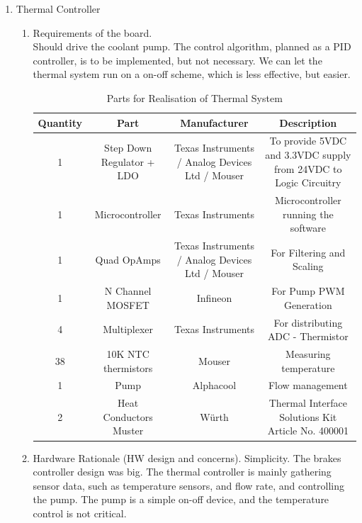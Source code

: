 \begin{enumerate}
\begin{enumerate}
    \end{enumerate}

    \item Thermal Controller
        \begin{enumerate}
            \item Requirements of the board.\\
            Should drive the coolant pump. The control algorithm, planned as a PID controller, is to be implemented, but not necessary. We can let the thermal system run on a on-off scheme, which is less effective, but easier.

          \begin{table}[H]
    \centering
    \begin{adjustbox}{width=\textwidth,center}
    \begin{tabular}{|c|c|c|c|}
        \hline
        \textbf{Quantity} & \textbf{Part} & \textbf{Manufacturer} & \textbf{Description} \\
        \hline
        1 & Step Down Regulator + LDO & Texas Instruments / Analog Devices Ltd / Mouser & To provide 5VDC and 3.3VDC supply from 24VDC to Logic Circuitry \\
        \hline
        1 & Microcontroller & Texas Instruments & Microcontroller running the software \\
        \hline
        1 & Quad OpAmps & Texas Instruments / Analog Devices Ltd / Mouser & For Filtering and Scaling \\
        \hline
        1 & N Channel MOSFET & Infineon & For Pump PWM Generation \\
        \hline
        4 & Multiplexer & Texas Instruments & For distributing ADC - Thermistor \\
        \hline
        38 & 10K NTC thermistors & Mouser& Measuring temperature\\
        \hline
        1& Pump& Alphacool & Flow management\\
        \hline
        2 & Heat Conductors Muster & Würth & Thermal Interface Solutions Kit Article No. 400001\\
        \hline
    \end{tabular}
    \end{adjustbox}
    \caption{Parts for Realisation of Thermal System}
    \label{tab:parts}
\end{table}
            \item Hardware Rationale (HW design and concerns).
            Simplicity. The brakes controller design was big. The thermal controller is mainly gathering sensor data, such as temperature sensors, and flow rate, and controlling the pump. The pump is a simple on-off device, and the temperature control is not critical. 

\end{enumerate}
\end{enumerate}
